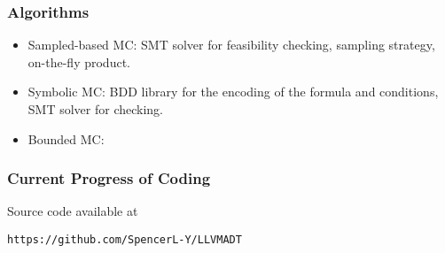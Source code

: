 \documentclass[11pt]{beamer}
\begin{document}
\begin{frame}\frametitle{Algorithms}
\begin{itemize}
\item  Sampled-based MC: SMT solver for feasibility checking, sampling strategy, on-the-fly product.
\item Symbolic MC: BDD library for the encoding of the formula and conditions, SMT solver for checking.

\item Bounded MC: 

\end{itemize}
\end{frame}


\begin{frame}\frametitle{Current Progress of Coding}
Source code available at
\begin{center}
\texttt{https://github.com/SpencerL-Y/LLVMADT}
\end{center}
\end{frame}
\end{document}
